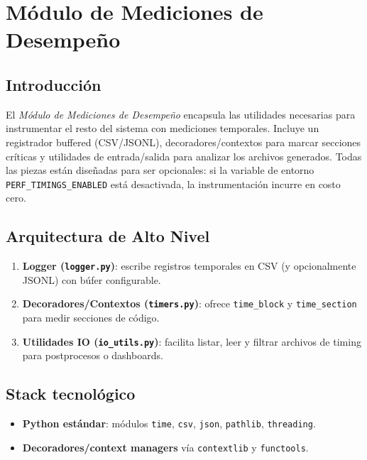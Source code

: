 
\section{Módulo de Mediciones de Desempeño}%
\label{sec:modulo-perf-timing}

\subsection{Introducción}
El \emph{Módulo de Mediciones de Desempeño} encapsula las utilidades necesarias para instrumentar el resto del sistema con mediciones temporales. Incluye un registrador buffered (CSV/JSONL), decoradores/contextos para marcar secciones críticas y utilidades de entrada/salida para analizar los archivos generados. Todas las piezas están diseñadas para ser opcionales: si la variable de entorno \texttt{PERF\_TIMINGS\_ENABLED} está desactivada, la instrumentación incurre en costo cero.

\subsection{Arquitectura de Alto Nivel}
\begin{enumerate}
    \item \textbf{Logger (\texttt{logger.py})}: escribe registros temporales en CSV (y opcionalmente JSONL) con búfer configurable.
    \item \textbf{Decoradores/Contextos (\texttt{timers.py})}: ofrece \texttt{time\_block} y \texttt{time\_section} para medir secciones de código.
    \item \textbf{Utilidades IO (\texttt{io\_utils.py})}: facilita listar, leer y filtrar archivos de timing para postprocesos o dashboards.
\end{enumerate}

\subsection{Stack tecnológico}
\begin{itemize}
    \item \textbf{Python estándar}: módulos \texttt{time}, \texttt{csv}, \texttt{json}, \texttt{pathlib}, \texttt{threading}.
    \item \textbf{Decoradores/context managers} vía \texttt{contextlib} y \texttt{functools}.
\end{itemize}

